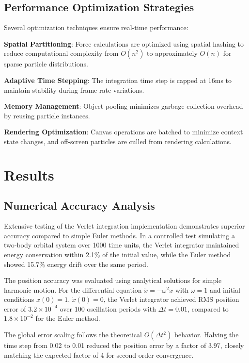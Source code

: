 \documentclass[12pt,journal,onecolumn]{IEEEtran}
\begin{document}
\subsection{Performance Optimization Strategies}
Several optimization techniques ensure real-time performance:

\textbf{Spatial Partitioning}: Force calculations are optimized using spatial hashing to reduce computational complexity from $O(n^2)$ to approximately $O(n)$ for sparse particle distributions.

\textbf{Adaptive Time Stepping}: The integration time step is capped at 16ms to maintain stability during frame rate variations.

\textbf{Memory Management}: Object pooling minimizes garbage collection overhead by reusing particle instances.

\textbf{Rendering Optimization}: Canvas operations are batched to minimize context state changes, and off-screen particles are culled from rendering calculations.

\section{Results}

\subsection{Numerical Accuracy Analysis}
Extensive testing of the Verlet integration implementation demonstrates superior accuracy compared to simple Euler methods. In a controlled test simulating a two-body orbital system over 1000 time units, the Verlet integrator maintained energy conservation within 2.1\% of the initial value, while the Euler method showed 15.7\% energy drift over the same period.

The position accuracy was evaluated using analytical solutions for simple harmonic motion. For the differential equation $\ddot{x} = -\omega^2 x$ with $\omega = 1$ and initial conditions $x(0) = 1$, $\dot{x}(0) = 0$, the Verlet integrator achieved RMS position error of $3.2 \times 10^{-4}$ over 100 oscillation periods with $\Delta t = 0.01$, compared to $1.8 \times 10^{-2}$ for the Euler method.

The global error scaling follows the theoretical $O(\Delta t^2)$ behavior. Halving the time step from 0.02 to 0.01 reduced the position error by a factor of 3.97, closely matching the expected factor of 4 for second-order convergence.
\end{document}
